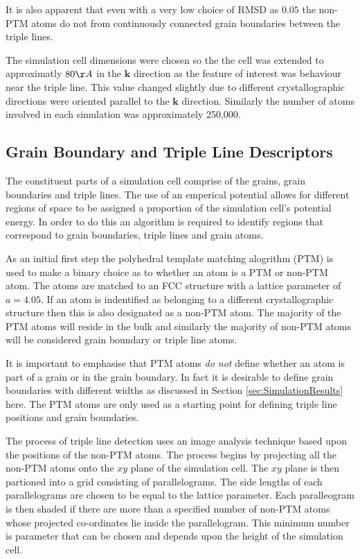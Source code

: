 \documentclass[12pt,a4paper]{book}
\begin{document}
It is also apparent that even with a very low choice of RMSD as $0.05$ the non-PTM atoms do not from continuously connected grain boundaries between the triple lines.

The simulation cell dimensions were chosen so the the cell was extended to approximatly $80 \AA$ in the $\mathbf{k}$ direction as the feature of interest was behaviour near the triple line. This value changed slightly due to different crystallographic directions were oriented parallel to the $\mathbf{k}$ direction. Similarly the number of atoms involved in each simulation was approximately 250,000.  


\subsection{Grain Boundary and Triple Line Descriptors}

The constituent parts of a simulation cell comprise of the grains, grain boundaries and triple lines. The use of an emperical potential allows for different regions of space to be assigned a proportion of the simulation cell's potential energy. In order to do this an algorithm is required to identify regions that correspond to grain boundaries, triple lines and grain atoms.

As an initial first step the polyhedral template matching alogrithm (PTM) is used to make a binary choice as to whether an atom is a PTM or non-PTM atom. The atoms are matched to an FCC structure with a lattice parameter of $a=4.05$. If an atom is indentified as belonging to a different crystallographic structure then this is also designated as a non-PTM atom. The majority of the PTM atoms will reside in the bulk and similarly the majority of non-PTM atoms will be considered grain boundary or triple line atoms. 

It is important to emphasise that PTM atoms \emph{do not} define whether an atom is part of a grain or in the grain boundary. In fact it is desirable to define grain boundaries with different widths as discussed in Section \ref{sec:SimulationResults} here. The PTM atoms are only used as a starting point for defining triple line positions and grain boundaries.

The process of triple line detection uses an image analysis technique based upon the positions of the non-PTM atoms. The process begins by projecting all the non-PTM atoms onto the $xy$ plane of the simulation cell. The $xy$ plane is then partioned into a grid consisting of parallelograms. The side lengths of each parallelograms are chosen to be equal to the lattice parameter. Each paralleogram is then shaded if there are more than a specified number of non-PTM atoms whose projected co-ordinates lie inside the parallelogram. This minimum number is parameter that can be chosen and depends upon the height of the simulation cell.
\end{document}

